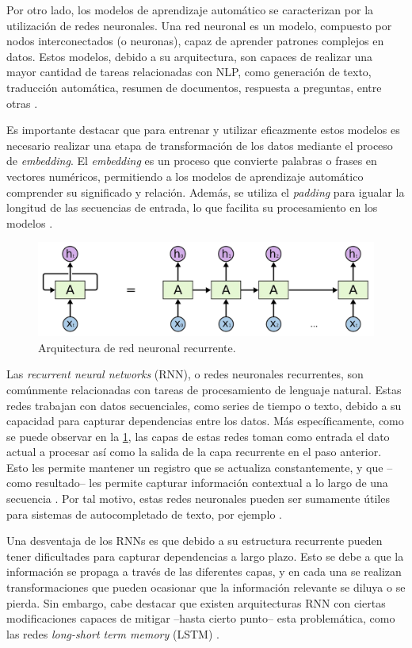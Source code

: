 Por otro lado, los modelos de aprendizaje automático se caracterizan por la utilización de redes neuronales. Una red neuronal es un modelo, compuesto por nodos interconectados (o neuronas), capaz de aprender patrones complejos en datos. Estos modelos, debido a su arquitectura, son capaces de realizar una mayor cantidad de tareas relacionadas con NLP, como generación de texto, traducción automática, resumen de documentos, respuesta a preguntas, entre otras \cite{twenty}. 

Es importante destacar que para entrenar y utilizar eficazmente estos modelos es necesario realizar una etapa de transformación de los datos mediante el proceso de \textit{embedding}. El \textit{embedding} es un proceso que convierte palabras o frases en vectores numéricos, permitiendo a los modelos de aprendizaje automático comprender su significado y relación. Además, se utiliza el \textit{padding} para igualar la longitud de las secuencias de entrada, lo que facilita su procesamiento en los modelos \cite{twentyone}.

\begin{figure}[H]
  \centering
  \includegraphics[width=0.5\linewidth]{figuras/RNN.png}
  \caption{Arquitectura de red neuronal recurrente.}
  \label{fig:RNN}
\end{figure}

Las \textit{recurrent neural networks} (RNN), o redes neuronales recurrentes, son comúnmente relacionadas con tareas de procesamiento de lenguaje natural. Estas redes trabajan con datos secuenciales, como series de tiempo o texto, debido a su capacidad para capturar dependencias entre los datos. Más específicamente, como se puede observar en la \ref{fig:RNN}, las capas de estas redes toman como entrada el dato actual a procesar así como la salida de la capa recurrente en el paso anterior. Esto les permite mantener un registro que se actualiza constantemente, y que –como resultado– les permite capturar información contextual a lo largo de una secuencia \cite{twentytwo}. Por tal motivo, estas redes neuronales pueden ser sumamente útiles para sistemas de autocompletado de texto, por ejemplo \cite{twentythree}. 

Una desventaja de los RNNs es que debido a su estructura recurrente pueden tener dificultades para capturar dependencias a largo plazo. Esto se debe a que la información se propaga a través de las diferentes capas, y en cada una se realizan transformaciones que pueden ocasionar que la información relevante se diluya o se pierda. Sin embargo, cabe destacar que existen arquitecturas RNN con ciertas modificaciones capaces de mitigar –hasta cierto punto– esta problemática, como las redes \textit{long-short term memory} (LSTM) \cite{twentythree}.

